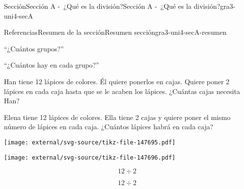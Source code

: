 \documentclass[twoside,10pt,]{article}
\begin{document}
\begin{sectionptx}{Sección}{Sección A -~¿Qué es la división?}{}{Sección A -~¿Qué es la división?}{}{}{gra3-uni4-secA}
\begin{references-subsection}{Referencias}{Resumen de la sección}{}{Resumen sección}{}{}{gra3-uni4-secA-resumen}
\begin{sidebyside}{2}{0.025}{0.025}{0.05}%
\begin{sbspanel}{0.45}%
``¿Cuántos grupos?''%
\end{sbspanel}%
\begin{sbspanel}{0.45}%
\par
``¿Cuántos hay en cada grupo?''%
\end{sbspanel}%
\end{sidebyside}%
\begin{sidebyside}{2}{0.025}{0.025}{0.05}%
\begin{sbspanel}{0.45}%
Han tiene 12 lápices de colores. Él quiere ponerlos en cajas. Quiere poner 2 lápices en cada caja hasta que se le acaben los lápices. ¿Cuántas cajas necesita Han?%
\end{sbspanel}%
\begin{sbspanel}{0.45}%
\par
Elena tiene 12 lápices de colores. Ella tiene 2 cajas y quiere poner el mismo número de lápices en cada caja. ¿Cuántos lápices habrá en cada caja?%
\end{sbspanel}%
\end{sidebyside}%
\begin{sidebyside}{2}{0.025}{0.025}{0.05}%
\begin{sbspanel}{0.45}%
\texttt{[image: external/svg-source/tikz-file-147695.pdf]}
\end{sbspanel}%
\begin{sbspanel}{0.45}%
\texttt{[image: external/svg-source/tikz-file-147696.pdf]}
\end{sbspanel}%
\end{sidebyside}%
\begin{sidebyside}{2}{0.025}{0.025}{0.05}%
\begin{sbspanel}{0.45}%
%
\begin{equation*}
12 \div 2
\end{equation*}
%
\end{sbspanel}%
\begin{sbspanel}{0.45}%
\par
%
\begin{equation*}
12 \div 2
\end{equation*}
%
\end{sbspanel}%
\end{sidebyside}%
\end{references-subsection}
\end{sectionptx}
%
%
\typeout{************************************************}
\end{document}
